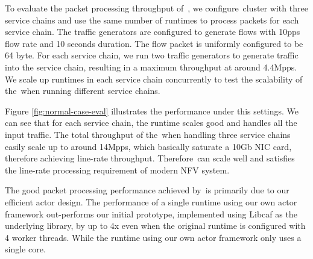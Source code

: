 
To evaluate the packet processing throughput of~\nfactor, we configure~\nfactor cluster with three service chains and use the same number of runtimes to process packets for each service chain. The traffic generators are configured to generate flows with 10pps flow rate and 10 seconds duration. The flow packet is uniformly configured to be 64 byte. For each service chain, we run two traffic generators to generate traffic into the service chain, resulting in a maximum throughput at around 4.4Mpps. We scale up runtimes in each service chain concurrently to test the scalability of the~\nfactor when running different service chains.

Figure \ref{fig:normal-case-eval} illustrates the performance under this settings. We can see that for each service chain, the runtime scales good and handles all the input traffic. The total throughput of the~\nfactor when handling three service chains easily scale up to around 14Mpps, which basically saturate a 10Gb NIC card, therefore achieving line-rate throughput. Therefore~\nfactor can scale well and satisfies the line-rate processing requirement of modern NFV system.

The good packet processing performance achieved by~\nfactor is primarily due to our efficient actor design. The performance of a single runtime using our own actor framework out-performs our initial prototype, implemented using Libcaf \cite{caf} as the underlying library, by up to 4x even when the original runtime is configured with 4 worker threads. While the runtime using our own actor framework only uses a single core.

